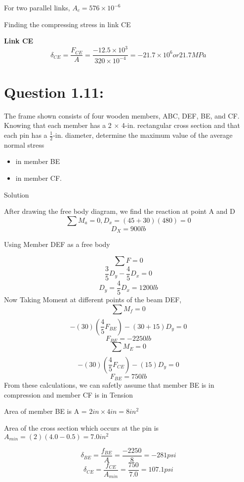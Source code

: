 \documentclass{article}
\begin{document}
For two parallel links, $A_{c} = 576 \times 10 ^ {-6} $


Finding the compressing stress in link CE

\textbf{Link CE}
\[\delta_{CE} = \frac{F_{CE}}{A} = \frac{-12.5 \times 10^{3}}{320 \times 10^{-4}} = {-21.7 \times 10^{6}} or 21.7MPa\]


\newline

\section*{\textbf{Question 1.11:}}
The frame shown consists of four wooden members, ABC, DEF,
BE, and CF. Knowing that each member has a 2 $ \times $ 4-in. rectangular cross section and that each pin has a $\frac{1}
{2} $-in. diameter, determine the maximum value of the average normal stress 
\begin{itemize}
	\item  in member BE
	\item  in member CF.
\end{itemize}
\begin{center} Solution \end{center}


After drawing the free body diagram,
we find the reaction at point A and D
\[\sum{}M_{a} = 0, D_{x} = (45 + 30)(480) = 0\]
\[ D_{X} = 900lb \]
\begin{center} Using Member DEF as a free body \end{center}
\[\sum{}F = 0\]
\[\frac{3}{5}D_{y} - \frac{4}{5}D_{x} = 0\]
\[D_{y} = \frac{4}{5}D_{x} = 1200lb\]
Now Taking Moment at different points of the beam DEF,
\[\sum_{} M_{f} = 0 \]   \[-(30)(\frac{4}{5}F_{BE}) - (30+15)D_{y} = 0\]    \[F_{BE} = -2250lb \]
\[\sum_{} M_{E} = 0 \]   \[-(30)(\frac{4}{5}F_{CE}) - (15)D_{y} = 0\]    \[F_{BE} = 750lb \]
From these calculations, we can safetly assume that member BE is in compression and member CF is in Tension

Area of member BE is A = $2in \times 4in = 8in^{2}$

Area of the cross section which occurs at the pin is $A_{min} = (2)(4.0-0.5)=7.0in^{2}$

\[\delta_{BE} = \frac{f_{BE}}{A} = \frac{-2250}{8}= -281psi\]
\[\delta_{CE} = \frac{f_{CE}}{A_{min}} = \frac{750}{7.0}= 107.1psi\]
\end{document}
